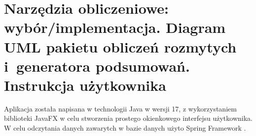 \documentclass{classrep}
\begin{document}


\section{Narzędzia obliczeniowe: wybór/implementacja. Diagram UML pakietu
obliczeń rozmytych i~generatora podsumowań. Instrukcja użytkownika}

Aplikacja została napisana w technologii Java w wersji 17, z wykorzystaniem biblioteki JavaFX \cite{javafx} w celu stworzenia prostego
okienkowego interfejsu użytkownika. W celu odczytania danych zawarytch w bazie danych \cite{database} użyto Spring Framework \cite{spring}. \\
\end{document}
